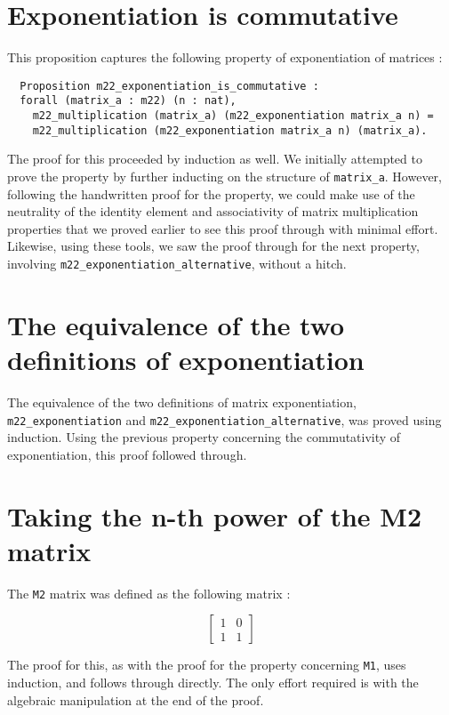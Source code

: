 \documentclass[12pt, a4paper]{article}
\begin{document}
\section{ Exponentiation is commutative}

This proposition captures the following property of exponentiation of matrices : 

\begin{lstlisting}
  Proposition m22_exponentiation_is_commutative :
  forall (matrix_a : m22) (n : nat),
    m22_multiplication (matrix_a) (m22_exponentiation matrix_a n) =
    m22_multiplication (m22_exponentiation matrix_a n) (matrix_a).
\end{lstlisting}

The proof for this proceeded by induction as well. We initially attempted to prove
the property by further inducting on the structure of \verb-matrix_a-. However,
following the handwritten proof for the property, we could make use of the neutrality
of the identity element and associativity of matrix multiplication properties that
we proved earlier to see this proof through with minimal effort. Likewise,
using these tools, we saw the proof through for the next property, involving 
\verb-m22_exponentiation_alternative-, without a hitch.


\section {The equivalence of the two definitions of exponentiation}

The equivalence of the two definitions of matrix exponentiation, 
\verb-m22_exponentiation- and \verb-m22_exponentiation_alternative-, 
was proved using induction. Using the previous property concerning the commutativity
of exponentiation, this proof followed through. 

\section {Taking the n-th power of the M2 matrix}

The \verb-M2- matrix was defined as the following matrix : 

$$
\begin{bmatrix}
  1 & 0 \\
  1 & 1
\end{bmatrix}
$$

The proof for this, as with the proof for the property concerning \verb-M1-, 
uses induction, and follows through directly. The only effort required is with 
the algebraic manipulation at the end of the proof. 
\end{document}
